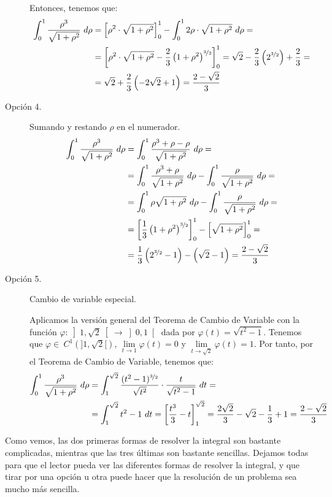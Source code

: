 \begin{ejercicio}
\begin{description}
        Entonces, tenemos que:
        \begin{align*}
            \int_0^1 \dfrac{\rho^3}{\sqrt{1+\rho^2}} ~d\rho &= \left[\rho^2\cdot \sqrt{1+\rho^2}\right]_0^1 - \int_0^1 2\rho\cdot \sqrt{1+\rho^2}~d\rho =\\
            &= \left[\rho^2\cdot \sqrt{1+\rho^2} - \dfrac{2}{3}\left(1+\rho^2\right)^{\nicefrac{3}{2}}\right]_0^1
            = \sqrt{2} - \dfrac{2}{3}\left(2^{\nicefrac{3}{2}}\right)+\dfrac{2}{3}
            =\\&= \sqrt{2} + \dfrac{2}{3}\left(-2\sqrt{2} + 1\right)
            = \dfrac{2-\sqrt{2}}{3}
        \end{align*}

        \item [Opción 4.] Sumando y restando $\rho$ en el numerador.
        \begin{align*}
            \int_0^1 \dfrac{\rho^3}{\sqrt{1+\rho^2}} ~d\rho &= \int_0^1 \dfrac{\rho^3+\rho-\rho}{\sqrt{1+\rho^2}} ~d\rho =\\
            &= \int_0^1 \dfrac{\rho^3+\rho}{\sqrt{1+\rho^2}} ~d\rho - \int_0^1 \dfrac{\rho}{\sqrt{1+\rho^2}} ~d\rho =\\
            &= \int_0^1 \rho\sqrt{1+\rho^2} ~d\rho - \int_0^1 \dfrac{\rho}{\sqrt{1+\rho^2}} ~d\rho =\\
            &= \left[\dfrac{1}{3}\left(1+\rho^2\right)^{\nicefrac{3}{2}}\right]_0^1 - \left[\sqrt{1+\rho^2}\right]_0^1 =\\
            &= \dfrac{1}{3}\left(2^{\nicefrac{3}{2}}-1\right) - \left(\sqrt{2}-1\right) = \dfrac{2-\sqrt{2}}{3}
        \end{align*}

        \item [Opción 5.] Cambio de variable especial.
        
        Aplicamos la versión general del Teorema de Cambio de Variable con la función $\varphi:\left]1,\sqrt{2}\right[\to \left]0,1\right[$ dada por $\varphi(t)=\sqrt{t^2-1}$.
        Tenemos que $\varphi\in~C^1\left(]1,\sqrt{2}[\right)$, $\lim\limits_{t\to 1}\varphi(t)=0$ y $\lim\limits_{t\to \sqrt{2}}\varphi(t)=1$. Por tanto, por el Teorema de Cambio de Variable, tenemos que:
        \begin{align*}
            \int_0^1 \dfrac{\rho^3}{\sqrt{1+\rho^2}} ~d\rho &= \int_1^{\sqrt{2}} \dfrac{(t^2-1)^{\nicefrac{3}{2}}}{\sqrt{t^2}}\cdot \dfrac{t}{\sqrt{t^2-1}}~dt =\\
            &= \int_1^{\sqrt{2}} t^2-1 ~dt
            = \left[\dfrac{t^3}{3}-t\right]_1^{\sqrt{2}} = \dfrac{2\sqrt{2}}{3}-\sqrt{2}-\dfrac{1}{3}+1 = \dfrac{2-\sqrt{2}}{3}
        \end{align*}
    \end{description}
    Como vemos, las dos primeras formas de resolver la integral son bastante complicadas, mientras que las tres últimas son bastante sencillas. Dejamos todas para que el lector pueda ver las diferentes formas de resolver la integral, y que tirar por una opción u otra puede hacer que la resolución de un problema sea mucho más sencilla.\\


\end{ejercicio}
